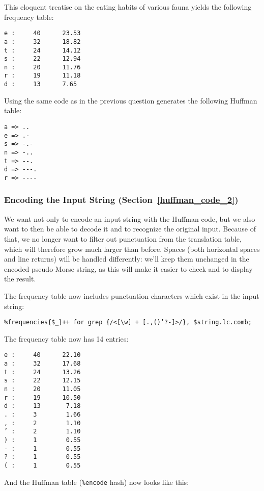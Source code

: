 This eloquent treatise on the eating habits of various fauna 
yields the following frequency table:

\begin{verbatim}
e :     40      23.53
a :     32      18.82
t :     24      14.12
s :     22      12.94
n :     20      11.76
r :     19      11.18
d :     13      7.65
\end{verbatim}

Using the same code as in the previous question generates the 
following Huffman table:

\begin{verbatim}
a => ..
e => .-
s => -.-
n => -..
t => --.
d => ---.
r => ----
\end{verbatim}

\subsubsection{Encoding the Input String (Section~\ref{huffman_code_2})}

We want not only to encode an input string with the Huffman code, but 
we also want to then be able to decode it and to recognize the original 
input. Because of that, we no longer want to filter out punctuation  
from the translation table, which will therefore grow much larger than 
before. Spaces (both horizontal spaces and line returns) will be handled 
differently: we'll keep them unchanged in the encoded pseudo-Morse 
string, as this will make it easier to check and to display the result.

The frequency table now includes punctuation characters which exist 
in the input string:

\begin{verbatim}
%frequencies{$_}++ for grep {/<[\w] + [.,()’?-]>/}, $string.lc.comb;
\end{verbatim}

The frequency table now has 14 entries:

\begin{verbatim}
e :     40      22.10
a :     32      17.68
t :     24      13.26
s :     22      12.15
n :     20      11.05
r :     19      10.50
d :     13       7.18
. :     3        1.66
, :     2        1.10
’ :     2        1.10
) :     1        0.55
- :     1        0.55
? :     1        0.55
( :     1        0.55
\end{verbatim}

And the Huffman table (\verb'%encode' hash) now looks like this:


